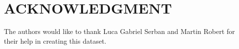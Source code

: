 \documentclass[letterpaper, 10 pt, conference]{ieeeconf}  %
\begin{document}




\section*{ACKNOWLEDGMENT}

The authors would like to thank Luca Gabriel Serban and Martin Robert for their help in creating this dataset.






\end{document}
